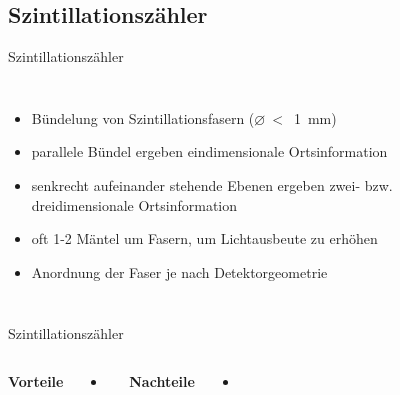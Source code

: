 	
\subsection[]{Szintillationszähler}



\begin{frame}{Szintillationszähler}
	\begin{columns}[T]
			\begin{itemize}
			  \item Bündelung von Szintillationsfasern ($\varnothing~<$~1~mm)
			  \item parallele Bündel ergeben eindimensionale Ortsinformation
			  \item senkrecht aufeinander stehende Ebenen ergeben zwei- bzw. dreidimensionale Ortsinformation
			  \item oft 1-2 Mäntel um Fasern, um Lichtausbeute zu erhöhen
			  \item Anordnung der Faser je nach Detektorgeometrie
			\end{itemize}	
	    	\begin{figure}[htbp]
			  \centering
			  
			\end{figure}
    \end{columns}
\end{frame}	
	
	\begin{frame}{Szintillationszähler}
    \begin{columns}[T]
			\textbf{Vorteile}		
			\vspace{0.7cm}
			\begin{itemize}
			  \item 
			\end{itemize}	
	    	\textbf{Nachteile}
	    	\vspace{0.7cm}
	    	\begin{itemize}
			  \item 
			\end{itemize}
    \end{columns}
\end{frame}